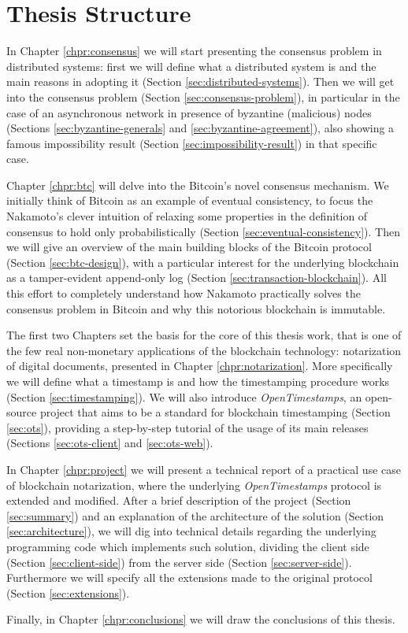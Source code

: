 \bigskip
\section{Thesis Structure}
In Chapter \ref{chpr:consensus} we will start presenting the consensus problem in distributed systems: first we will define what a distributed system is and the main reasons in adopting it (Section \ref{sec:distributed-systems}). Then we will get into the consensus problem (Section \ref{sec:consensus-problem}), in particular in the case of an asynchronous network in presence of byzantine (malicious) nodes (Sections \ref{sec:byzantine-generals} and \ref{sec:byzantine-agreement}), also showing a famous impossibility result (Section \ref{sec:impossibility-result}) in that specific case.

\bigskip
\noindent
Chapter \ref{chpr:btc} will delve into the Bitcoin's novel consensus mechanism. We initially think of Bitcoin as an example of eventual consistency, to focus the Nakamoto's clever intuition of relaxing some properties in the definition of consensus to hold only probabilistically (Section \ref{sec:eventual-consistency}). Then we will give an overview of the main building blocks of the Bitcoin protocol (Section \ref{sec:btc-design}), with a particular interest for the underlying blockchain as a tamper-evident append-only log (Section \ref{sec:transaction-blockchain}). All this effort to completely understand how Nakamoto practically solves the consensus problem in Bitcoin and why this notorious blockchain is immutable.

\bigskip
\noindent
The first two Chapters set the basis for the core of this thesis work, that is one of the few real non-monetary applications of the blockchain technology: notarization of digital documents, presented in Chapter \ref{chpr:notarization}. More specifically we will define what a timestamp is and how the timestamping procedure works (Section \ref{sec:timestamping}). We will also introduce \textit{OpenTimestamps}, an open-source project that aims to be a standard for blockchain timestamping (Section \ref{sec:ots}), providing a step-by-step tutorial of the usage of its main releases (Sections \ref{sec:ots-client} and \ref{sec:ots-web}).

\bigskip
\noindent
In Chapter \ref{chpr:project} we will present a technical report of a practical use case of blockchain notarization, where the underlying \textit{OpenTimestamps} protocol is extended and modified. After a brief description of the project (Section \ref{sec:summary}) and an explanation of the architecture of the solution (Section \ref{sec:architecture}), we will dig into technical details regarding the underlying programming code which implements such solution, dividing the client side (Section \ref{sec:client-side}) from the server side (Section \ref{sec:server-side}). Furthermore we will specify all the extensions made to the original protocol (Section \ref{sec:extensions}).

\bigskip
\noindent
Finally, in Chapter \ref{chpr:conclusions} we will draw the conclusions of this thesis.